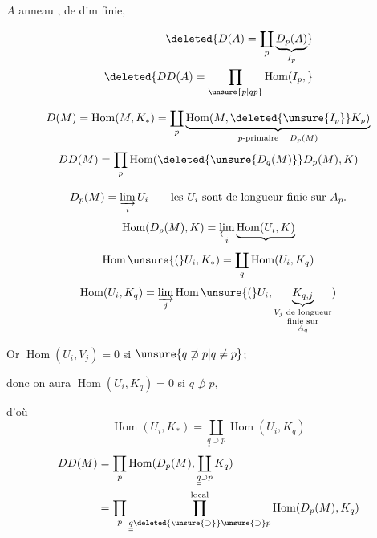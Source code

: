 $A$ anneau , de dim finie, 

\[
\begin{aligned}
\deleted{D(A)=\coprod_p\underbrace{D_p(A)}_{I_p}}\\
\deleted{DD(A)=\prod_{\unsure{p|qp}}\operatorname{Hom}(I_p,}
\end{aligned}
\]

\[
D(M)=\operatorname{Hom}(M,K_*)=\coprod_p
\underbrace{\operatorname{Hom}(M,\deleted{\unsure{I_p}}K_p)}_{p\text{-primaire}\quad D_p(M)}
\]
\[
DD(M)=\prod_p\operatorname{Hom}(\deleted{\unsure{D_q(M)}}D_p(M),K)
\]

\[
D_p(M)=\varinjlim_i U_i
\qquad\text{les $U_i$ sont de longueur finie sur $A_p$.}
\]
\[
\operatorname{Hom}(D_p(M),K)=\varprojlim_i\underbrace{\operatorname{Hom}(U_i,K)}
\]
\[
\operatorname{Hom}\unsure{(}U_i,K_*)=\coprod_q\operatorname{Hom}(U_i,K_q)
\]
\[
\operatorname{Hom}(U_i,K_q)=\varinjlim_j\operatorname{Hom}\unsure{(}U_i,
\underbrace{K_{q,j}}_{\substack{V_j\text{ de longueur}\\\text{finie sur}\\A_q}})
\]


Or $\operatorname{Hom}(U_i,V_j)=0$ si $\unsure{q\not\supset p|q\ne p}$;

donc on aura $\operatorname{Hom}(U_i,K_q)=0$ si $q\not\supset p$,

d'où
\[
\operatorname{Hom}(U_i,K_*)=\coprod_{\underline{\underline q}\supset p}\operatorname{Hom}(U_i,K_q)
\]
\[
\begin{aligned}
DD(M)&=\prod_p\operatorname{Hom}(D_p(M),\coprod_{\underline{\underline q}\supset p}K_q)\\
&=\prod_p\prod_{\underline{\underline q}\deleted{\unsure{\supset}}\unsure{\supset}p}^{\mathrm{local}}\operatorname{Hom}(D_p(M),K_q)
\end{aligned}
\]
